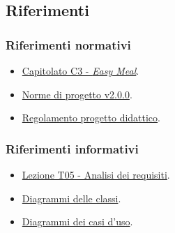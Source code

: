 \subsection{Riferimenti}
\subsubsection{Riferimenti normativi}
\begin{itemize}
    \item \href{https://www.math.unipd.it/~tullio/IS-1/2023/Progetto/C3.pdf}{Capitolato C3 - \textit{Easy Meal}}.
    \item \href{https://project-swenergy.github.io/}{Norme di progetto v2.0.0}.
    \item \href{https://www.math.unipd.it/~tullio/IS-1/2023/Dispense/PD2.pdf}{Regolamento progetto didattico}.
\end{itemize}

\subsubsection{Riferimenti informativi}
\begin{itemize}
    \item \href{https://www.math.unipd.it/~tullio/IS-1/2023/Dispense/T5.pdf}{Lezione T05 - Analisi dei requisiti}.
    \item \href{https://www.math.unipd.it/~rcardin/swea/2023/Diagrammi%20delle%20Classi.pdf}{Diagrammi delle classi}.
    \item \href{https://www.math.unipd.it/~rcardin/swea/2022/Diagrammi%20Use%20Case.pdf}{Diagrammi dei casi d'uso}.
\end{itemize}